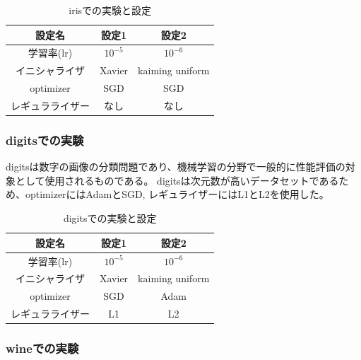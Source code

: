 \begin{table}[htbp]
    \begin{center}
        \caption{irisでの実験と設定}
        \vspace{5mm} 
        \begin{tabular}{ |c|c|c| }
        設定名 & 設定1 & 設定2 \\
        \hline
        学習率(lr)         & $ 10^{-5} $ & $ 10^{-6} $ \\
        イニシャライザ       & Xavier &  kaiming uniform \\
        optimizer           & SGD & SGD \\
        レギュラライザー     & なし & なし \\
        \end{tabular}
    \end{center}
\end{table}



\subsubsection{digitsでの実験}

digitsは数字の画像の分類問題であり、機械学習の分野で一般的に性能評価の対象として使用されるものである。
digitsは次元数が高いデータセットであるため、optimizerにはAdamとSGD, レギュライザーにはL1とL2を使用した。

\begin{table}[htbp]
    \begin{center}
        \caption{digitsでの実験と設定}
        \vspace{5mm} 
        \begin{tabular}{ |c|c|c| }
        設定名 & 設定1 & 設定2 \\
        \hline
        学習率(lr)         & $ 10^{-5} $ & $ 10^{-6} $ \\
        イニシャライザ       & Xavier & kaiming uniform \\
        optimizer           & SGD & Adam \\
        レギュラライザー     & L1 & L2 \\
        \end{tabular}
    \end{center}
\end{table}



\subsubsection{wineでの実験}

